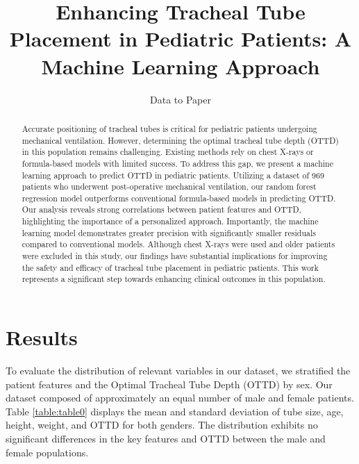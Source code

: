 \documentclass[11pt]{article}
\title{Enhancing Tracheal Tube Placement in Pediatric Patients: A Machine Learning Approach}
\author{Data to Paper}
\begin{document}
\maketitle
\begin{abstract}
Accurate positioning of tracheal tubes is critical for pediatric patients undergoing mechanical ventilation. However, determining the optimal tracheal tube depth (OTTD) in this population remains challenging. Existing methods rely on chest X-rays or formula-based models with limited success. To address this gap, we present a machine learning approach to predict OTTD in pediatric patients. Utilizing a dataset of 969 patients who underwent post-operative mechanical ventilation, our random forest regression model outperforms conventional formula-based models in predicting OTTD. Our analysis reveals strong correlations between patient features and OTTD, highlighting the importance of a personalized approach. Importantly, the machine learning model demonstrates greater precision with significantly smaller residuals compared to conventional models. Although chest X-rays were used and older patients were excluded in this study, our findings have substantial implications for improving the safety and efficacy of tracheal tube placement in pediatric patients. This work represents a significant step towards enhancing clinical outcomes in this population.
\end{abstract}
\section*{Results}

To evaluate the distribution of relevant variables in our dataset, we stratified the patient features and the Optimal Tracheal Tube Depth (OTTD) by sex. Our dataset composed of approximately an equal number of male and female patients. Table \ref{table:table0} displays the mean and standard deviation of tube size, age, height, weight, and OTTD for both genders. The distribution exhibits no significant differences in the key features and OTTD between the male and female populations.
\end{document}
